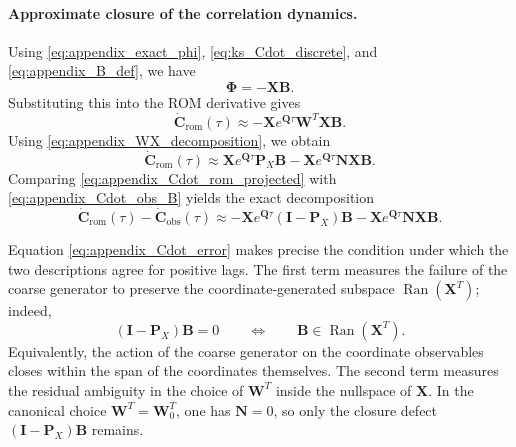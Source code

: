 \documentclass[%
  prl,
  reprint,
  amsmath,
  amssymb,
  aps
]{revtex4-2}
\begin{document}
\paragraph{Approximate closure of the correlation dynamics.}
Using \eqref{eq:appendix_exact_phi}, \eqref{eq:ks_Cdot_discrete}, and \eqref{eq:appendix_B_def}, we have
\begin{equation}
    \bm{\Phi}
    =
    -\bm{X}\bm{B}.
\end{equation}
Substituting this into the ROM derivative gives
\begin{equation}
    \dot{\bm{C}}_{\mathrm{rom}}(\tau)
    \approx
    -\bm{X}e^{\bm{Q}\tau}\bm{W}^T\bm{X}\bm{B}.
\end{equation}
Using \eqref{eq:appendix_WX_decomposition}, we obtain
\begin{equation}
    \dot{\bm{C}}_{\mathrm{rom}}(\tau)
    \approx
    \bm{X}e^{\bm{Q}\tau}\bm{P}_X\bm{B}
    -
    \bm{X}e^{\bm{Q}\tau}\bm{N}\bm{X}\bm{B}.
\label{eq:appendix_Cdot_rom_projected}
\end{equation}
Comparing \eqref{eq:appendix_Cdot_rom_projected} with \eqref{eq:appendix_Cdot_obs_B} yields the exact decomposition
\begin{equation}
    \dot{\bm{C}}_{\mathrm{rom}}(\tau)-\dot{\bm{C}}_{\mathrm{obs}}(\tau)
    \approx
    -\bm{X}e^{\bm{Q}\tau}(\bm{I}-\bm{P}_X)\bm{B}
    -
    \bm{X}e^{\bm{Q}\tau}\bm{N}\bm{X}\bm{B}.
\label{eq:appendix_Cdot_error}
\end{equation}

Equation \eqref{eq:appendix_Cdot_error} makes precise the condition under which the two descriptions agree for positive lags. The first term measures the failure of the coarse generator to preserve the coordinate-generated subspace $\operatorname{Ran}(\bm{X}^T)$; indeed,
\begin{equation}
    (\bm{I}-\bm{P}_X)\bm{B}=0
    \qquad\Longleftrightarrow\qquad
    \bm{B}\in \operatorname{Ran}(\bm{X}^T).
\end{equation}
Equivalently, the action of the coarse generator on the coordinate observables closes within the span of the coordinates themselves. The second term measures the residual ambiguity in the choice of $\bm{W}^T$ inside the nullspace of $\bm{X}$. In the canonical choice $\bm{W}^T=\bm{W}_0^T$, one has $\bm{N}=0$, so only the closure defect $(\bm{I}-\bm{P}_X)\bm{B}$ remains.
\end{document}
